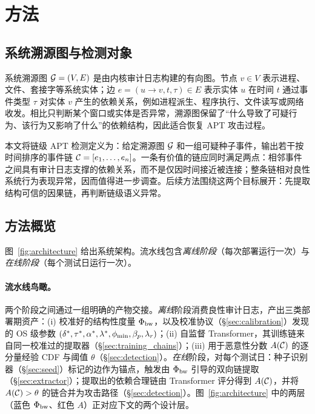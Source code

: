 \section{方法}
\label{sec:method}
\label{sec:design}

\subsection{系统溯源图与检测对象}
\label{sec:provenance_graph}

系统溯源图 $\mathcal{G}=(V,E)$ 是由内核审计日志构建的有向图。节点 $v\in V$ 表示进程、文件、套接字等系统实体；边 $e=(u\rightarrow v,t,\tau)\in E$ 表示实体 $u$ 在时间 $t$ 通过事件类型 $\tau$ 对实体 $v$ 产生的依赖关系，例如进程派生、程序执行、文件读写或网络收发。相比只判断某个窗口或实体是否异常，溯源图保留了“什么导致了可疑行为、该行为又影响了什么”的依赖结构，因此适合恢复 APT 攻击过程。

本文将链级 APT 检测定义为：给定溯源图 $\mathcal{G}$ 和一组可疑种子事件，输出若干按时间排序的事件链 $\mathcal{C}=[e_1,\ldots,e_n]$。一条有价值的链应同时满足两点：相邻事件之间具有审计日志支撑的依赖关系，而不是仅因时间接近被连接；整条链相对良性系统行为表现异常，因而值得进一步调查。后续方法围绕这两个目标展开：先提取结构可信的因果链，再判断链级语义异常。

\subsection{方法概览}



图~\ref{fig:architecture} 给出系统架构。流水线包含\emph{离线阶段}（每次部署运行一次）与\emph{在线阶段}（每个测试日运行一次）。

\paragraph{流水线鸟瞰。}两个阶段之间通过一组明确的产物交接。\emph{离线}阶段消费良性审计日志，产出三类部署期资产：(i) 校准好的结构性度量 $\Phi_{\text{bw}}$，以及校准协议（\S\ref{sec:calibration}）发现的 OS 级参数 $(\delta^*, \tau^*, \alpha^*, \lambda^*, \phi_{\min}, \beta_p, \lambda_r)$；(ii) 自监督 Transformer，其训练链来自同一校准过的提取器（\S\ref{sec:training_chains}）；(iii) 用于恶意性分数 $A(\mathcal{C})$ 的逐分量经验 CDF 与阈值 $\theta$（\S\ref{sec:detection}）。\emph{在线}阶段，对每个测试日：种子识别器（\S\ref{sec:seed}）标记的边作为锚点，触发由 $\Phi_{\text{bw}}$ 引导的双向链提取（\S\ref{sec:extractor}）；提取出的依赖合理链由 Transformer 评分得到 $A(\mathcal{C})$，并将 $A(\mathcal{C}) > \theta$ 的链合并为攻击路径（\S\ref{sec:detection}）。图~\ref{fig:architecture} 中的两层（蓝色 $\Phi_{\text{bw}}$、红色 $A$）正对应下文的两个设计层。

